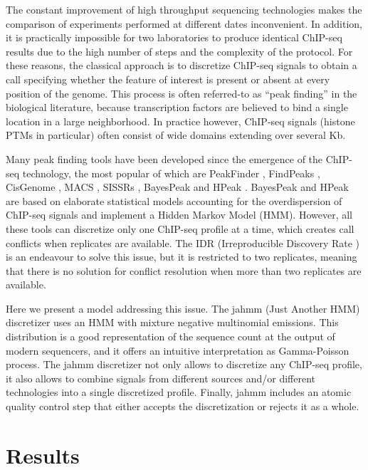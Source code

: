 \documentclass[12pt]{article}
\begin{document}
The constant improvement of high throughput sequencing technologies makes the comparison of experiments performed at different dates inconvenient. In addition, it is practically impossible for two laboratories to produce identical ChIP-seq results due to the high number of steps and the complexity of the protocol. For these reasons, the classical approach is to discretize ChIP-seq signals to obtain a call specifying whether the feature of interest is present or absent at every position of the genome. This process is often referred-to as ``peak finding'' in the biological literature, because transcription factors are believed to bind a single location in a large neighborhood. In practice however, ChIP-seq signals (histone PTMs in particular) often consist of wide domains extending over several Kb.

Many peak finding tools have been developed since the emergence of the ChIP-seq technology, the most popular of which are PeakFinder \cite{pmid17540862}, FindPeaks \cite{pmid18599518}, CisGenome \cite{pmid18978777}, MACS \cite{pmid18798982}, SISSRs \cite{pmid18684996}, BayesPeak \cite{pmid19772557} and HPeak \cite{pmid20598134}. BayesPeak and HPeak are based on elaborate statistical models accounting for the overdispersion of ChIP-seq signals and implement a Hidden Markov Model (HMM). However, all these tools can discretize only one ChIP-seq profile at a time, which creates call conflicts when replicates are available. The IDR (Irreproducible Discovery Rate \cite{li2011}) is an endeavour to solve this issue, but it is restricted to two replicates, meaning that there is no solution for conflict resolution when more than two replicates are available.

Here we present a model addressing this issue. The jahmm (Just Another HMM) discretizer uses an HMM with mixture negative multinomial emissions. This distribution is a good representation of the sequence count at the output of modern sequencers, and it offers an intuitive interpretation as Gamma-Poisson process. The jahmm discretizer not only allows to discretize any ChIP-seq profile, it also allows to combine signals from different sources and/or different technologies into a single discretized profile. Finally, jahmm includes an atomic quality control step that either accepts the discretization or rejects it as a whole.

\section{Results}
\end{document}
